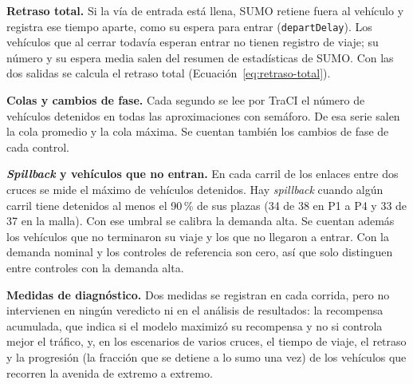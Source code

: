 \noindent\textbf{Retraso total.} Si la vía de entrada está llena, SUMO
retiene fuera al vehículo y registra ese tiempo aparte, como su espera
para entrar (\texttt{departDelay}). Los vehículos que al cerrar todavía
esperan entrar no tienen registro de viaje; su número y su espera media
salen del resumen de estadísticas de SUMO. Con las dos salidas se
calcula el retraso total (Ecuación~\ref{eq:retraso-total}).

\noindent\textbf{Colas y cambios de fase.} Cada segundo se lee por
TraCI el número de vehículos detenidos en todas las aproximaciones con
semáforo. De esa serie salen la cola promedio y la cola máxima. Se
cuentan también los cambios de fase de cada control.

\noindent\textbf{\textit{Spillback} y vehículos que no entran.} En cada
carril de los enlaces entre dos cruces se mide el máximo de vehículos
detenidos. Hay \textit{spillback} cuando algún carril tiene detenidos
al menos el 90\,\% de sus plazas (34 de 38 en P1 a P4 y 33 de 37 en la
malla). Con ese umbral se calibra la demanda alta. Se cuentan además
los vehículos que no terminaron su viaje y los que no llegaron a
entrar. Con la demanda nominal y los controles de referencia son cero,
así que solo distinguen entre controles con la demanda alta.

\noindent\textbf{Medidas de diagnóstico.} Dos medidas se registran en
cada corrida, pero no intervienen en ningún veredicto ni en el análisis
de resultados: la recompensa acumulada, que indica si el modelo maximizó
su recompensa y no si controla mejor el tráfico, y, en los escenarios de
varios cruces, el tiempo de viaje, el retraso y la progresión (la
fracción que se detiene a lo sumo una vez) de los vehículos que recorren
la avenida de extremo a extremo.


